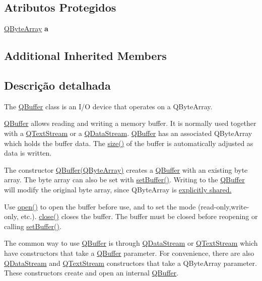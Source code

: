 \subsection*{Atributos Protegidos}
\begin{DoxyCompactItemize}
\item 
\hypertarget{class_q_buffer_af75393be365d6ef924f083eaf2d778dd}{\hyperlink{class_q_array}{Q\-Byte\-Array} {\bfseries a}}\label{class_q_buffer_af75393be365d6ef924f083eaf2d778dd}

\end{DoxyCompactItemize}
\subsection*{Additional Inherited Members}


\subsection{Descrição detalhada}
The \hyperlink{class_q_buffer}{Q\-Buffer} class is an I/\-O device that operates on a Q\-Byte\-Array. 

\hyperlink{class_q_buffer}{Q\-Buffer} allows reading and writing a memory buffer. It is normally used together with a \hyperlink{class_q_text_stream}{Q\-Text\-Stream} or a \hyperlink{class_q_data_stream}{Q\-Data\-Stream}. \hyperlink{class_q_buffer}{Q\-Buffer} has an associated Q\-Byte\-Array which holds the buffer data. The \hyperlink{class_q_buffer_a7e63723212bed1ca52f0fe57e58b812e}{size()} of the buffer is automatically adjusted as data is written.

The constructor {\ttfamily \hyperlink{class_q_buffer_a98bfc70efe53b2a957b62ab36ea5a2d2}{Q\-Buffer(\-Q\-Byte\-Array)}} creates a \hyperlink{class_q_buffer}{Q\-Buffer} with an existing byte array. The byte array can also be set with \hyperlink{class_q_buffer_aa534d25726eede2993b4895e9b8ceb21}{set\-Buffer()}. Writing to the \hyperlink{class_q_buffer}{Q\-Buffer} will modify the original byte array, since Q\-Byte\-Array is \hyperlink{}{explicitly shared.}

Use \hyperlink{class_q_buffer_ae7331757d844e703f2f6e4727e454193}{open()} to open the buffer before use, and to set the mode (read-\/only,write-\/only, etc.). \hyperlink{class_q_buffer_a5ae591df94fc66ccb85cbb6565368bca}{close()} closes the buffer. The buffer must be closed before reopening or calling \hyperlink{class_q_buffer_aa534d25726eede2993b4895e9b8ceb21}{set\-Buffer()}.

The common way to use \hyperlink{class_q_buffer}{Q\-Buffer} is through  \hyperlink{class_q_data_stream}{Q\-Data\-Stream} or  \hyperlink{class_q_text_stream}{Q\-Text\-Stream} which have constructors that take a \hyperlink{class_q_buffer}{Q\-Buffer} parameter. For convenience, there are also \hyperlink{class_q_data_stream}{Q\-Data\-Stream} and \hyperlink{class_q_text_stream}{Q\-Text\-Stream} constructors that take a Q\-Byte\-Array parameter. These constructors create and open an internal \hyperlink{class_q_buffer}{Q\-Buffer}.

